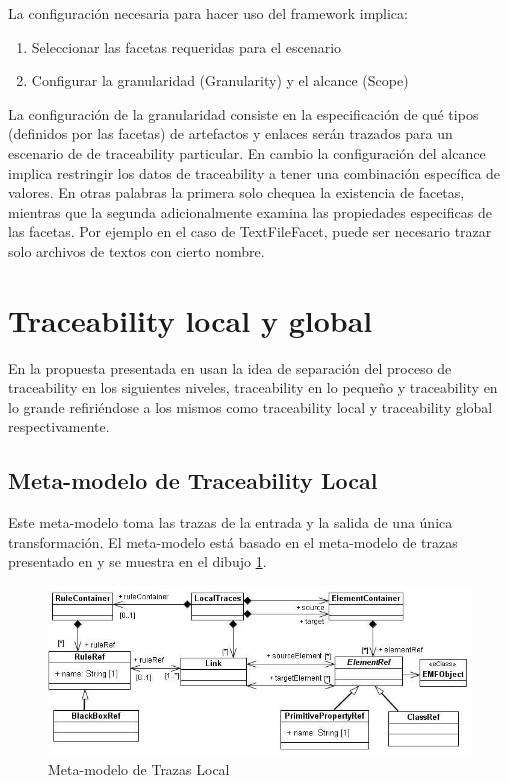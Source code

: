\documentclass[a4paper,12pt,oneside]{book}
\begin{document}
La configuración necesaria para hacer uso del framework implica:

\begin{enumerate}
\item    Seleccionar las facetas requeridas para el escenario
\item    Configurar la granularidad (Granularity) y el alcance (Scope)
\end{enumerate}

La configuración de la granularidad consiste en la especificación de qué tipos (definidos por las facetas) de artefactos y enlaces serán trazados para un escenario de de traceability particular. En cambio la configuración del alcance implica restringir los datos de traceability a tener una combinación específica de valores. En otras palabras la primera solo chequea la existencia de facetas, mientras que la segunda adicionalmente examina las propiedades especificas de las facetas. Por ejemplo en el caso de TextFileFacet, puede ser necesario trazar solo archivos de textos con cierto nombre.

\section{Traceability local y global}

En la propuesta presentada en \cite{GlitiaEtienDumoulin} usan la idea de separación del proceso de traceability en los siguientes niveles, traceability en lo pequeño y traceability en lo grande refiriéndose a los mismos como traceability local y traceability global respectivamente.

\subsection{Meta-modelo de Traceability Local}

Este meta-modelo toma las trazas de la entrada y la salida de una única transformación. El meta-modelo está basado en el meta-modelo de trazas presentado en \cite{Jouault} y se muestra en el dibujo \ref{fig:LocalTraceMetamodel}.

\begin{figure}[hbtp]
\centering
\includegraphics[scale=.55]{./img/LocalTraceMetamodel}
\caption{Meta-modelo de Trazas Local}
\label{fig:LocalTraceMetamodel}
\end{figure}
\end{document}
